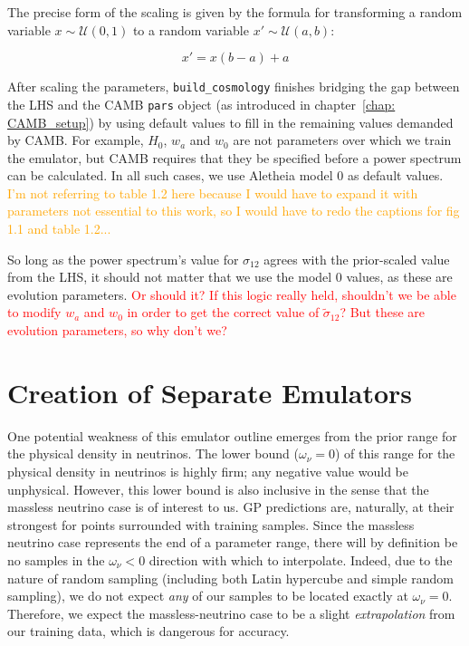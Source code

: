 The precise form of the scaling is given by the formula for transforming a
random variable $x \sim \mathcal{U}(0, 1)$ to a random variable
$x' \sim \mathcal{U}(a, b)$:

\begin{equation}
\label{eq: scaling}
x' = x (b - a) + a
\end{equation}

After scaling the parameters, \verb|build_cosmology| finishes bridging the gap
between the LHS and the CAMB \verb|pars| object (as introduced in
chapter~\ref{chap: CAMB_setup}) by using default values to fill in the
remaining values demanded by CAMB. For example, $H_0$, $w_a$ and $w_0$ are
not parameters over
which we train the emulator, but CAMB requires that they be specified before
a power spectrum can be calculated. In all such cases, we use Aletheia model
0 as default values. \textcolor{orange}{I'm not referring to table 1.2 here
because I would have to expand it with parameters not essential to this work,
so I would have to redo the captions for fig 1.1 and table 1.2...}

So long as the power spectrum's value for $\sigma_{12}$ agrees with the
prior-scaled value from the LHS, it should not matter that 
we use the model 0 values, as these are evolution parameters.
\textcolor{red}{Or should it? If this logic really held, shouldn't we be able 
to modify $w_a$ and $w_0$ in order to get the correct value of
$\tilde{\sigma}_{12}$? But these are evolution parameters, so why don't we?}


\section{Creation of Separate Emulators}
\label{sec: 2emu_intro}

One potential weakness of this emulator outline emerges 
from the prior range for the physical density in neutrinos. The lower bound 
($\omega_\nu = 0$) of this range for the physical density in neutrinos is 
highly firm; any negative value would be unphysical. However, this 
lower bound is also inclusive in the sense that the massless neutrino case is  
of interest to us. GP predictions are, naturally, at their 
strongest for points surrounded with training samples. Since the massless 
neutrino case represents the end of a parameter range, there will by 
definition be no samples in the $\omega_\nu < 0$ direction with which to
interpolate. Indeed, due to the nature of random sampling (including both 
Latin hypercube and simple random sampling), we do not expect \textit{any}
of our
samples to be located exactly at $\omega_\nu = 0$.
Therefore, we expect the massless-neutrino case to be a slight
\textit{extrapolation} from our training data, which is dangerous for 
accuracy.


